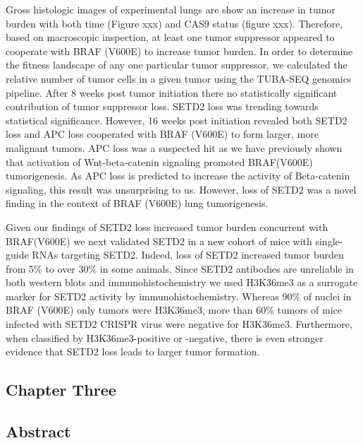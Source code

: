 Gross histologic images of experimental lungs are show an increase in tumor burden with both time (Figure xxx) and CAS9 status (figure xxx). Therefore, based on macroscopic inspection, at least one tumor suppressor appeared to cooperate with BRAF (V600E) to increase tumor burden. In order to determine the fitness landscape of any one particular tumor suppressor, we calculated the relative number of tumor cells in a given tumor using the TUBA-SEQ genomics pipeline. After 8 weeks post tumor initiation there no statistically significant contribution of tumor suppressor loss. SETD2 loss was trending towards statistical significance. However, 16 weeks post initiation revealed both SETD2 loss and APC loss cooperated with BRAF (V600E) to form larger, more malignant tumors. APC loss was a suspected hit as we have previously shown that activation of Wnt-beta-catenin signaling promoted BRAF(V600E) tumorigenesis. As APC loss is predicted to increase the activity of Beta-catenin signaling, this result was unsurprising to us. However, loss of SETD2 was a novel finding in the context of BRAF (V600E) lung tumorigenesis.

Given our findings of SETD2 loss increased tumor burden concurrent with BRAF(V600E) we next validated SETD2 in a new cohort of mice with single-guide RNAs targeting SETD2. Indeed, loss of SETD2 increased tumor burden from 5\% to over 30\% in some animals. Since SETD2 antibodies are unreliable in both western blots and immunohistochemistry we used H3K36me3 as a surrogate marker for SETD2 activity by immunohistochemistry. Whereas 90\% of nuclei in BRAF (V600E) only tumors were H3K36me3, more than 60\% tumors of mice infected with SETD2 CRISPR virus were negative for H3K36me3. Furthermore, when classified by H3K36me3-positive or -negative, there is even stronger evidence that SETD2 loss leads to larger tumor formation.

\hypertarget{chapter-three}{%
\subsection{Chapter Three}\label{chapter-three}}

\hypertarget{abstract}{%
\subsection{Abstract}\label{abstract}}

